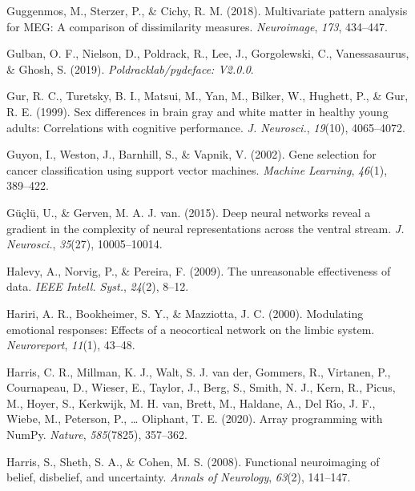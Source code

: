 \documentclass[11pt,american,a4paper,oneside,]{memoir} %
\begin{document}
\leavevmode\hypertarget{ref-Guggenmos2018-rr}{}%
Guggenmos, M., Sterzer, P., \& Cichy, R. M. (2018). Multivariate pattern analysis for MEG: A comparison of dissimilarity measures. \emph{Neuroimage}, \emph{173}, 434--447.

\leavevmode\hypertarget{ref-Gulban2019-sv}{}%
Gulban, O. F., Nielson, D., Poldrack, R., Lee, J., Gorgolewski, C., Vanessasaurus, \& Ghosh, S. (2019). \emph{Poldracklab/pydeface: V2.0.0}.

\leavevmode\hypertarget{ref-Gur1999-qj}{}%
Gur, R. C., Turetsky, B. I., Matsui, M., Yan, M., Bilker, W., Hughett, P., \& Gur, R. E. (1999). Sex differences in brain gray and white matter in healthy young adults: Correlations with cognitive performance. \emph{J. Neurosci.}, \emph{19}(10), 4065--4072.

\leavevmode\hypertarget{ref-guyon2002gene}{}%
Guyon, I., Weston, J., Barnhill, S., \& Vapnik, V. (2002). Gene selection for cancer classification using support vector machines. \emph{Machine Learning}, \emph{46}(1), 389--422.

\leavevmode\hypertarget{ref-Guclu2015-qj}{}%
Güçlü, U., \& Gerven, M. A. J. van. (2015). Deep neural networks reveal a gradient in the complexity of neural representations across the ventral stream. \emph{J. Neurosci.}, \emph{35}(27), 10005--10014.

\leavevmode\hypertarget{ref-Halevy2009-cv}{}%
Halevy, A., Norvig, P., \& Pereira, F. (2009). The unreasonable effectiveness of data. \emph{IEEE Intell. Syst.}, \emph{24}(2), 8--12.

\leavevmode\hypertarget{ref-Hariri2000-sc}{}%
Hariri, A. R., Bookheimer, S. Y., \& Mazziotta, J. C. (2000). Modulating emotional responses: Effects of a neocortical network on the limbic system. \emph{Neuroreport}, \emph{11}(1), 43--48.

\leavevmode\hypertarget{ref-Harris2020-en}{}%
Harris, C. R., Millman, K. J., Walt, S. J. van der, Gommers, R., Virtanen, P., Cournapeau, D., Wieser, E., Taylor, J., Berg, S., Smith, N. J., Kern, R., Picus, M., Hoyer, S., Kerkwijk, M. H. van, Brett, M., Haldane, A., Del Rı́o, J. F., Wiebe, M., Peterson, P., \ldots{} Oliphant, T. E. (2020). Array programming with NumPy. \emph{Nature}, \emph{585}(7825), 357--362.

\leavevmode\hypertarget{ref-harris2008functional}{}%
Harris, S., Sheth, S. A., \& Cohen, M. S. (2008). Functional neuroimaging of belief, disbelief, and uncertainty. \emph{Annals of Neurology}, \emph{63}(2), 141--147.
\end{document}
